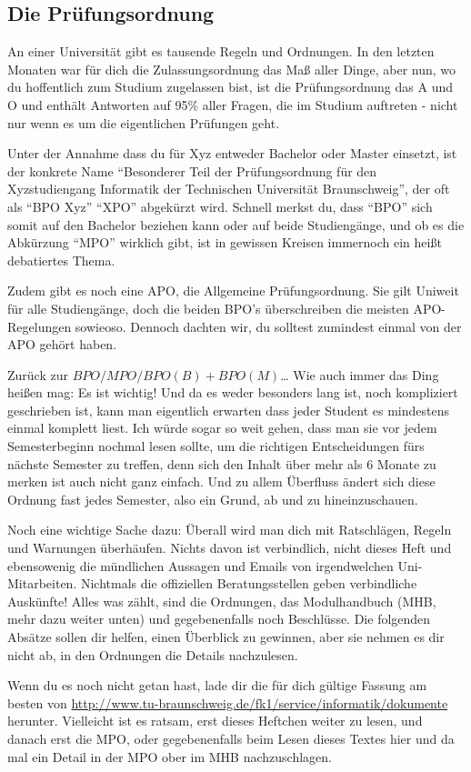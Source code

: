 \label{po}\subsection{Die Prüfungsordnung}
An einer Universität gibt es tausende Regeln und Ordnungen. In den letzten Monaten war für dich die Zulassungsordnung das Maß aller Dinge, aber nun, wo du hoffentlich zum Studium zugelassen bist, ist die Prüfungsordnung das A und O und enthält Antworten auf 95\% aller Fragen, die im Studium auftreten - nicht nur wenn es um die eigentlichen Prüfungen geht. 

Unter der Annahme dass du für Xyz entweder Bachelor oder Master einsetzt, ist der konkrete Name "`Besonderer Teil der Prüfungsordnung für den Xyzstudiengang Informatik der Technischen Universität Braunschweig"', der oft als "`BPO Xyz"' "`XPO"' abgekürzt wird. Schnell merkst du, dass "`BPO"' sich somit auf den Bachelor beziehen kann oder auf beide Studiengänge, und ob es die Abkürzung "`MPO"' wirklich gibt, ist in gewissen Kreisen immernoch ein heißt debatiertes Thema.

Zudem gibt es noch eine APO, die Allgemeine Prüfungsordnung. Sie gilt Uniweit für alle Studiengänge, doch die beiden BPO's überschreiben die meisten APO-Regelungen sowieoso. Dennoch dachten wir, du solltest zumindest einmal von der APO gehört haben.

Zurück zur $BPO/MPO/BPO(B)+BPO(M)$\ldots{} Wie auch immer das Ding heißen mag: Es ist wichtig! Und da es weder besonders lang ist, noch kompliziert geschrieben ist, kann man eigentlich erwarten dass jeder Student es mindestens einmal komplett liest. Ich würde sogar so weit gehen, dass man sie vor jedem Semesterbeginn nochmal lesen sollte, um die richtigen Entscheidungen fürs nächste Semester zu treffen, denn sich den Inhalt über mehr als 6 Monate zu merken ist auch nicht ganz einfach. Und zu allem Überfluss ändert sich diese Ordnung fast jedes Semester, also ein Grund, ab und zu hineinzuschauen.

Noch eine wichtige Sache dazu: Überall wird man dich mit Ratschlägen, Regeln und Warnungen überhäufen. Nichts davon ist verbindlich, nicht dieses Heft und ebensowenig die mündlichen Aussagen und Emails von irgendwelchen Uni-Mitarbeiten. Nichtmals die offiziellen Beratungsstellen geben verbindliche Auskünfte! Alles was zählt, sind die Ordnungen, das Modulhandbuch (MHB, mehr dazu weiter unten) und gegebenenfalls noch Beschlüsse. Die folgenden Absätze sollen dir helfen, einen Überblick zu gewinnen, aber sie nehmen es dir nicht ab, in den Ordnungen die Details nachzulesen.

Wenn du es noch nicht getan hast, lade dir die für dich gültige Fassung am besten von \url{http://www.tu-braunschweig.de/fk1/service/informatik/dokumente} herunter. Vielleicht ist es ratsam, erst dieses Heftchen weiter zu lesen, und danach erst die MPO, oder gegebenenfalls beim Lesen dieses Textes hier und da mal ein Detail in der MPO ober im MHB nachzuschlagen.


